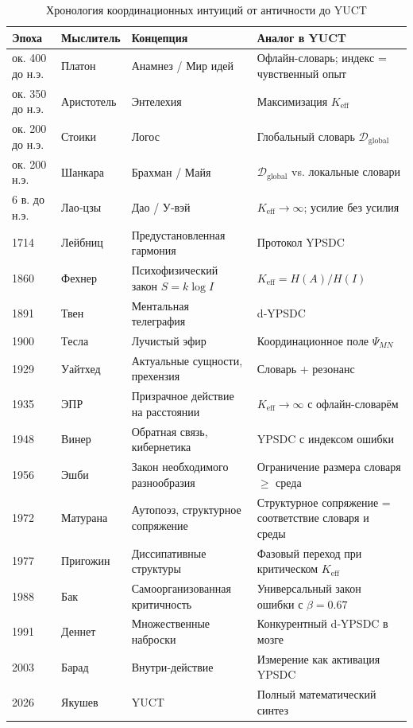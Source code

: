 \documentclass[12pt,a4paper]{article}
\begin{document}
	\begin{table}[htbp]
		\centering
		\caption{Хронология координационных интуиций от античности до YUCT}
		\label{tab:timeline}
		\small
		\begin{tabular}{p{1.2cm}p{3cm}p{4.5cm}p{6cm}}
			\toprule
			\textbf{Эпоха} & \textbf{Мыслитель} & \textbf{Концепция} & \textbf{Аналог в YUCT} \\
			\midrule
			ок. 400 до н.э. & Платон & Анамнез / Мир идей & Офлайн-словарь; индекс = чувственный опыт \\
			ок. 350 до н.э. & Аристотель & Энтелехия & Максимизация \(K_{\mathrm{eff}}\) \\
			ок. 200 до н.э. & Стоики & Логос & Глобальный словарь \(\mathcal{D}_{\text{global}}\) \\
			ок. 200 н.э. & Шанкара & Брахман / Майя & \(\mathcal{D}_{\text{global}}\) vs. локальные словари \\
			6 в. до н.э. & Лао‑цзы & Дао / У‑вэй & \(K_{\mathrm{eff}} \to \infty\); усилие без усилия \\
			1714 & Лейбниц & Предустановленная гармония & Протокол YPSDC \\
			1860 & Фехнер & Психофизический закон \(S = k \log I\) & \(K_{\mathrm{eff}} = H(A)/H(I)\) \\
			1891 & Твен & Ментальная телеграфия & d‑YPSDC \\
			1900 & Тесла & Лучистый эфир & Координационное поле \(\Psi_{MN}\) \\
			1929 & Уайтхед & Актуальные сущности, прехензия & Словарь + резонанс \\
			1935 & ЭПР & Призрачное действие на расстоянии & \(K_{\mathrm{eff}} \to \infty\) с офлайн-словарём \\
			1948 & Винер & Обратная связь, кибернетика & YPSDC с индексом ошибки \\
			1956 & Эшби & Закон необходимого разнообразия & Ограничение размера словаря \(\ge\) среда \\
			1972 & Матурана & Аутопоэз, структурное сопряжение & Структурное сопряжение = соответствие словаря и среды \\
			1977 & Пригожин & Диссипативные структуры & Фазовый переход при критическом \(K_{\mathrm{eff}}\) \\
			1988 & Бак & Самоорганизованная критичность & Универсальный закон ошибки с \(\beta = 0.67\) \\
			1991 & Деннет & Множественные наброски & Конкурентный d‑YPSDC в мозге \\
			2003 & Барад & Внутри‑действие & Измерение как активация YPSDC \\
			2026 & Якушев & YUCT & Полный математический синтез \\
			\bottomrule
		\end{tabular}
	\end{table}
	
\end{document}
